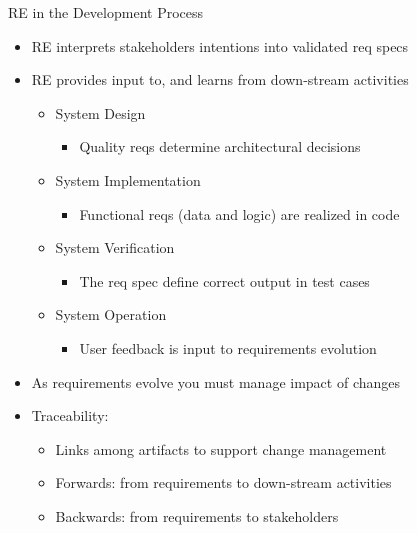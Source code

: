 
\begin{Slide}{RE in the Development Process}

\begin{itemize}
\item RE interprets stakeholders intentions into validated req specs
\item RE provides input to, and learns from down-stream activities
\begin{itemize}
\item System Design
\begin{itemize}
\item Quality reqs determine architectural decisions
\end{itemize}
\item System Implementation
\begin{itemize}
\item Functional reqs (data and logic) are realized in code  
\end{itemize}
\item System Verification 
\begin{itemize}
\item The req spec define correct output in test cases
\end{itemize}
\item System Operation
\begin{itemize}
\item User feedback is input to requirements evolution
\end{itemize}
\end{itemize}
\item As requirements evolve you must manage impact of changes
\item Traceability: 
\begin{itemize}
\item Links among artifacts to support change management
\item Forwards: from requirements to down-stream activities
\item Backwards: from requirements to stakeholders

\end{itemize}
\end{itemize}
\end{Slide}